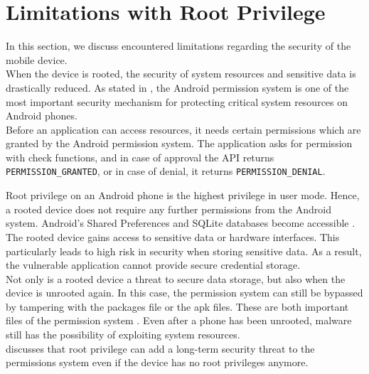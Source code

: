 \section{Limitations with Root Privilege} \label{limitations}
In this section, we discuss encountered limitations regarding the security of the mobile device. \\
When the device is rooted, the security of system resources and sensitive data is drastically reduced. As stated in \cite{DBLP:conf/acisp/ZhangWJWL14}, the Android permission system is one of the most important security mechanism for protecting critical system resources on Android phones. \\
Before an application can access resources, it needs certain permissions which are granted by the Android permission system. The application asks for permission with check functions, and in case of approval the API returns \texttt{PERMISSION\_GRANTED}, or in case of denial, it returns \texttt{PERMISSION\_DENIAL}.

Root privilege on an Android phone is the highest privilege in user mode. Hence, a rooted device does not require any further permissions from the Android system. Android's Shared Preferences and SQLite databases become accessible \cite{DBLP:conf/nsyss/ShezanAI17}. The rooted device gains access to sensitive data or hardware interfaces. This particularly leads to high risk in security when storing sensitive data. As a result, the vulnerable application cannot provide secure credential storage. \\

Not only is a rooted device a threat to secure data storage, but also when the device is unrooted again. In this case, the permission system can still be bypassed by tampering with the packages file or the apk files. These are both important files of the permission system \cite{DBLP:conf/acisp/ZhangWJWL14}. Even after a phone has been unrooted, malware still has the possibility of exploiting system resources. \\ \cite{DBLP:conf/acisp/ZhangWJWL14} discusses that root privilege can add a long-term security threat to the permissions system even if the device has no root privileges anymore.